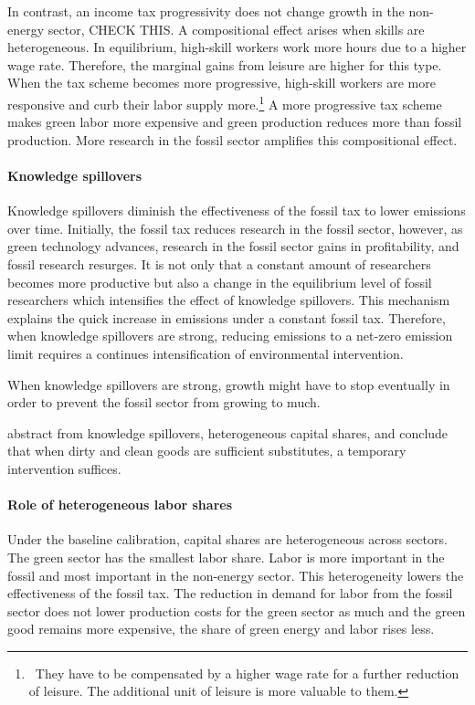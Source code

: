  In contrast, an income tax progressivity does not change growth in the non-energy sector, CHECK THIS. A compositional effect arises when skills are heterogeneous. In equilibrium, high-skill workers work more hours due to a higher wage rate. Therefore, the marginal gains from leisure are higher for this type. When the tax scheme becomes more progressive, high-skill workers are more responsive and curb their labor supply more.\footnote{\ They have to be compensated by a higher wage rate for a further reduction of leisure. The additional unit of leisure is more valuable to them.}  A more progressive tax scheme makes green labor more expensive and green production reduces more than fossil production. More research in the fossil sector amplifies this compositional effect. %
 
 \paragraph{Knowledge spillovers}
 Knowledge spillovers diminish the effectiveness of the fossil tax to lower emissions over time. Initially, the fossil tax reduces research in the fossil sector, however, as green technology advances, research in the fossil sector gains in profitability, and fossil research resurges. It is not only that a constant amount of researchers becomes more productive but also a change in the equilibrium level of fossil researchers which intensifies the effect of knowledge spillovers. This mechanism explains the quick increase in emissions under a constant fossil tax. Therefore, when knowledge spillovers are strong, reducing emissions to a net-zero emission limit requires a continues intensification of environmental intervention. 
 
 When knowledge spillovers are strong, growth might have to stop eventually in order to prevent the fossil sector from growing to much. 
 
 \cite{Acemoglu2012TheChange} abstract from knowledge spillovers, heterogeneous capital shares, and conclude that when dirty and clean goods are sufficient substitutes, a temporary intervention suffices. 
 \paragraph{Role of heterogeneous labor shares}
 Under the baseline calibration, capital shares are heterogeneous across sectors. The green sector has the smallest labor share. Labor is more important in the fossil and most important in the non-energy sector. This heterogeneity lowers the effectiveness of the fossil tax. The reduction in demand for labor from the fossil sector does not lower production costs for the green sector as much and the green good remains more expensive, the share of green energy and labor rises less. 

